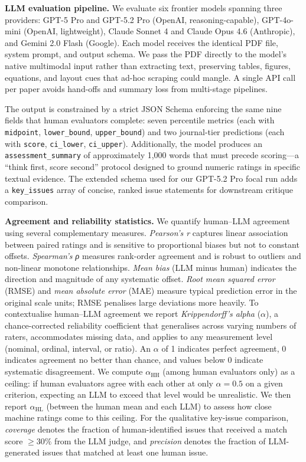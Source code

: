 \documentclass[
  11pt,
  letterpaper,
]{article}
\begin{document}
\textbf{LLM evaluation pipeline.} We evaluate six frontier models
spanning three providers: GPT-5 Pro and GPT-5.2 Pro (OpenAI,
reasoning-capable), GPT-4o-mini (OpenAI, lightweight), Claude Sonnet 4
and Claude Opus 4.6 (Anthropic), and Gemini 2.0 Flash (Google). Each
model receives the identical PDF file, system prompt, and output schema.
We pass the PDF directly to the model's native multimodal input rather
than extracting text, preserving tables, figures, equations, and layout
cues that ad-hoc scraping could mangle. A single API call per paper
avoids hand-offs and summary loss from multi-stage pipelines.

The output is constrained by a strict JSON Schema enforcing the same
nine fields that human evaluators complete: seven percentile metrics
(each with \texttt{midpoint}, \texttt{lower\_bound},
\texttt{upper\_bound}) and two journal-tier predictions (each with
\texttt{score}, \texttt{ci\_lower}, \texttt{ci\_upper}). Additionally,
the model produces an \texttt{assessment\_summary} of approximately
1,000 words that must precede scoring---a ``think first, score second''
protocol designed to ground numeric ratings in specific textual
evidence. The extended schema used for our GPT-5.2 Pro focal run adds a
\texttt{key\_issues} array of concise, ranked issue statements for
downstream critique comparison.

\textbf{Agreement and reliability statistics.} We quantify human--LLM
agreement using several complementary measures. \emph{Pearson's r}
captures linear association between paired ratings and is sensitive to
proportional biases but not to constant offsets. \emph{Spearman's ρ}
measures rank-order agreement and is robust to outliers and non-linear
monotone relationships. \emph{Mean bias} (LLM minus human) indicates the
direction and magnitude of any systematic offset. \emph{Root mean
squared error} (RMSE) and \emph{mean absolute error} (MAE) measure
typical prediction error in the original scale units; RMSE penalises
large deviations more heavily. To contextualise human--LLM agreement we
report \emph{Krippendorff's alpha} (\(\alpha\)), a chance-corrected
reliability coefficient that generalises across varying numbers of
raters, accommodates missing data, and applies to any measurement level
(nominal, ordinal, interval, or ratio). An \(\alpha\) of 1 indicates
perfect agreement, 0 indicates agreement no better than chance, and
values below 0 indicate systematic disagreement. We compute
\(\alpha_{\text{HH}}\) (among human evaluators only) as a ceiling: if
human evaluators agree with each other at only \(\alpha = 0.5\) on a
given criterion, expecting an LLM to exceed that level would be
unrealistic. We then report \(\alpha_{\text{HL}}\) (between the human
mean and each LLM) to assess how close machine ratings come to this
ceiling. For the qualitative key-issue comparison, \emph{coverage}
denotes the fraction of human-identified issues that received a match
score \(\geq 30\%\) from the LLM judge, and \emph{precision} denotes the
fraction of LLM-generated issues that matched at least one human issue.
\end{document}
